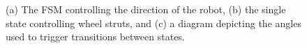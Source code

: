 \begin{figure}[!ht]
    \centering

    \hfil




    \caption{(a) The FSM controlling the direction of the robot, (b) the single state controlling wheel struts, and (c) a diagram depicting the angles used to trigger transitions between states.}
    \label{fig:fsm}


\end{figure}


